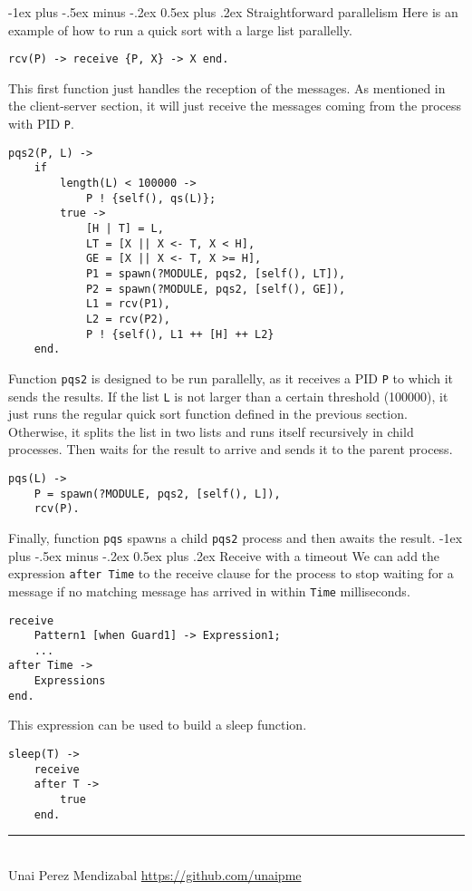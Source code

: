 \documentclass[10pt,landscape]{article}
\makeatletter
\renewcommand{\section}{\@startsection{section}{1}{0mm}%
                                {-1ex plus -.5ex minus -.2ex}%
                                {0.5ex plus .2ex}%
                                {\normalfont\large\bfseries}}
\makeatother
\begin{document}
\begin{multicols}{3}
\section{Straightforward parallelism}
Here is an example of how to run a quick sort with a large list parallelly.
\begin{verbatim}
rcv(P) -> receive {P, X} -> X end.
\end{verbatim}
This first function just handles the reception of the messages. As mentioned in the client-server section, it will just receive the messages coming from the process with PID \texttt{P}.
\begin{verbatim}
pqs2(P, L) ->
    if
        length(L) < 100000 ->
            P ! {self(), qs(L)};
        true ->
            [H | T] = L,
            LT = [X || X <- T, X < H],
            GE = [X || X <- T, X >= H],
            P1 = spawn(?MODULE, pqs2, [self(), LT]),
            P2 = spawn(?MODULE, pqs2, [self(), GE]),
            L1 = rcv(P1),
            L2 = rcv(P2),
            P ! {self(), L1 ++ [H] ++ L2}
    end.
\end{verbatim}
Function \texttt{pqs2} is designed to be run parallelly, as it receives a PID \texttt{P} to which it sends the results. If the list \texttt{L} is not larger than a certain threshold (100000), it just runs the regular quick sort function defined in the previous section. Otherwise, it splits the list in two lists and runs itself recursively in child processes. Then waits for the result to arrive and sends it to the parent process.
\begin{verbatim}
pqs(L) ->
    P = spawn(?MODULE, pqs2, [self(), L]),
    rcv(P).
\end{verbatim}
Finally, function \texttt{pqs} spawns a child \texttt{pqs2} process and then awaits the result.
\section{Receive with a timeout}
We can add the expression \texttt{after Time} to the receive clause for the process to stop waiting for a message if no matching message has arrived in within \texttt{Time} milliseconds.
\begin{verbatim}
receive
    Pattern1 [when Guard1] -> Expression1;
    ...
after Time ->
    Expressions
end.
\end{verbatim}
This expression can be used to build a sleep function.
\begin{verbatim}
sleep(T) ->
    receive
    after T ->
        true
    end.
\end{verbatim}
\vfill
\hrule
~\\
Unai Perez Mendizabal \textcopyright \href{https://github.com/unaipme}{https://github.com/unaipme}
\end{multicols}
\end{document}

